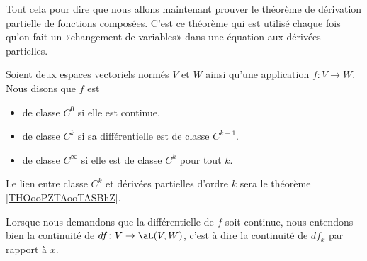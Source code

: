 \begin{normaltext}
    Tout cela pour dire que nous allons maintenant prouver le théorème de dérivation partielle de fonctions composées. C'est ce théorème qui est utilisé chaque fois qu'on fait un «changement de variables» dans une équation aux dérivées partielles.
\end{normaltext}

\begin{definition}  \label{DefPNjMGqy}
    Soient deux espaces vectoriels normés \( V\) et \( W\) ainsi qu'une application \( f\colon V\to W\). Nous disons que \( f\) est 
    \begin{itemize}
        \item de classe  \( C^0\) si elle est continue,
        \item de classe \( C^k\) si sa différentielle est de classe \( C^{k-1}\).
        \item de classe \( C^{\infty}\) si elle est de classe \( C^k\) pour tout \( k\).
    \end{itemize}
\end{definition}

Le lien entre classe \( C^k\) et dérivées partielles d'ordre \( k\) sera le théorème \ref{THOooPZTAooTASBhZ}.

\begin{remark}
    Lorsque nous demandons que la différentielle de \( f\) soit continue, nous entendons bien la continuité de \( df\colon V\to \aL(V,W)\), c'est à dire la continuité de \( df_x\) par rapport à \( x\).
\end{remark}


